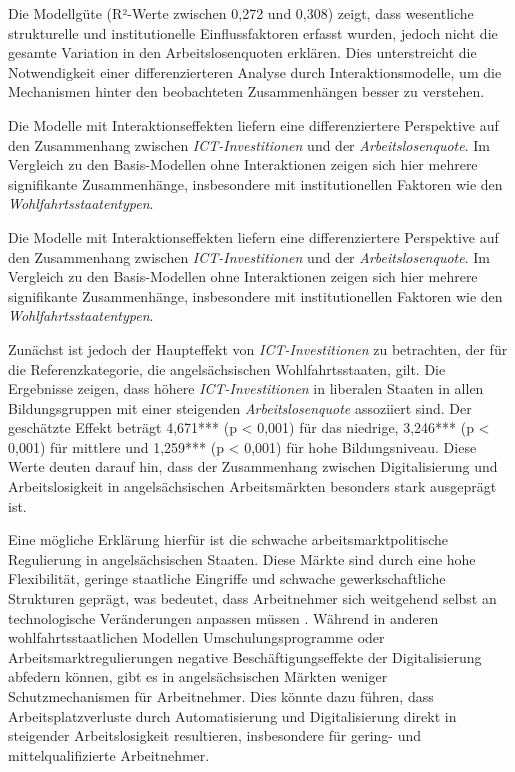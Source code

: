 Die Modellgüte (R²-Werte zwischen 0,272 und 0,308) zeigt, dass wesentliche strukturelle 
und institutionelle Einflussfaktoren erfasst wurden, jedoch nicht die gesamte Variation in 
den Arbeitslosenquoten erklären. Dies unterstreicht die Notwendigkeit einer 
differenzierteren Analyse durch Interaktionsmodelle, um die Mechanismen hinter den 
beobachteten Zusammenhängen besser zu verstehen.



Die Modelle mit Interaktionseffekten liefern eine differenziertere Perspektive auf den 
Zusammenhang zwischen \textit{\ac{ICT}-Investitionen} und der \textit{Arbeitslosenquote}. 
Im Vergleich zu den Basis-Modellen ohne Interaktionen zeigen sich hier mehrere 
signifikante Zusammenhänge, insbesondere mit institutionellen Faktoren wie den 
\textit{Wohlfahrtsstaatentypen}.

Die Modelle mit Interaktionseffekten liefern eine differenziertere Perspektive auf den 
Zusammenhang zwischen \textit{\ac{ICT}-Investitionen} und der \textit{Arbeitslosenquote}. 
Im Vergleich zu den Basis-Modellen ohne Interaktionen zeigen sich hier mehrere 
signifikante Zusammenhänge, insbesondere mit institutionellen Faktoren wie den 
\textit{Wohlfahrtsstaatentypen}. 

Zunächst ist jedoch der Haupteffekt von \textit{\ac{ICT}-Investitionen} zu betrachten, 
der für die Referenzkategorie, die angelsächsischen Wohlfahrtsstaaten, gilt. Die 
Ergebnisse zeigen, dass höhere \textit{\ac{ICT}-Investitionen} in liberalen Staaten in 
allen Bildungsgruppen mit einer steigenden \textit{Arbeitslosenquote} assoziiert sind. 
Der geschätzte Effekt beträgt 4,671*** (p < 0,001) für das niedrige, 3,246*** 
(p < 0,001) für mittlere und 1,259*** (p < 0,001) für hohe Bildungsniveau. Diese Werte 
deuten darauf hin, dass der Zusammenhang zwischen Digitalisierung und Arbeitslosigkeit 
in angelsächsischen Arbeitsmärkten besonders stark ausgeprägt ist. 

Eine mögliche Erklärung hierfür ist die schwache arbeitsmarktpolitische Regulierung 
in angelsächsischen Staaten. Diese Märkte sind durch eine hohe Flexibilität, geringe 
staatliche Eingriffe und schwache gewerkschaftliche Strukturen geprägt, was bedeutet, 
dass Arbeitnehmer sich weitgehend selbst an technologische Veränderungen anpassen müssen 
\parencite[vgl.][S. 27–33]{hall2001varieties}. Während in anderen wohlfahrtsstaatlichen 
Modellen Umschulungsprogramme oder Arbeitsmarktregulierungen negative 
Beschäftigungseffekte der Digitalisierung abfedern können, gibt es in angelsächsischen 
Märkten weniger Schutzmechanismen für Arbeitnehmer. Dies könnte dazu führen, dass 
Arbeitsplatzverluste durch Automatisierung und Digitalisierung direkt in steigender 
Arbeitslosigkeit resultieren, insbesondere für gering- und mittelqualifizierte 
Arbeitnehmer.

